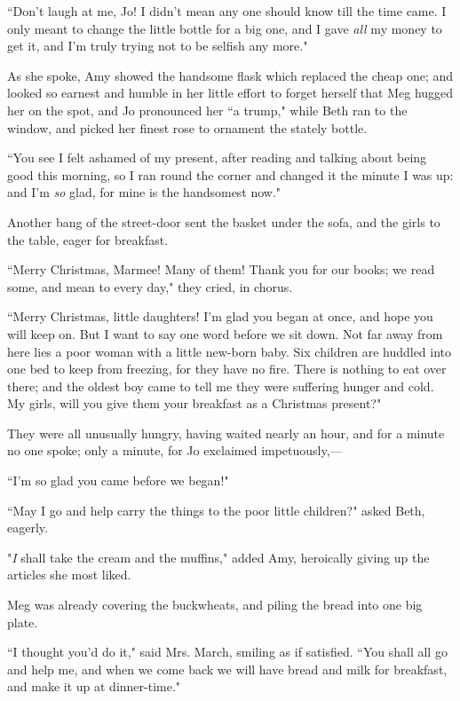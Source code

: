``Don't laugh at me, Jo! I didn't mean
any one should know till the time came. I only meant to change the
little bottle for a big one, and I gave \emph{all} my money to get it,
and I'm truly trying not to be selfish any more."

As she spoke, Amy showed the handsome flask which replaced the cheap
one; and looked so earnest and humble in her little effort to forget
herself that Meg hugged her on the spot, and Jo pronounced her ``a
trump," while Beth ran to the window, and picked her finest rose to
ornament the stately bottle.

``You see I felt ashamed of my present, after reading and talking about
being good this morning, so I ran round the corner and changed it the
minute I was up: and I'm \emph{so} glad, for mine is the
handsomest now."

Another bang of the street-door sent the basket under the sofa, and the
girls to the table, eager for breakfast.

``Merry Christmas, Marmee! Many of them! Thank you for our books; we read
some, and mean to every day," they cried, in chorus.

``Merry Christmas, little daughters! I'm glad you began
at once, and hope you will keep on. But I want to say one word before we
sit down. Not far away from here lies a poor woman with a little
new-born baby. Six children are huddled into one bed to keep from
freezing, for they have no fire. There is nothing to eat over there; and
the oldest boy came to tell me they were suffering hunger and cold. My
girls, will you give them your breakfast as a Christmas present?"

They were all unusually hungry, having waited nearly an hour, and for a
minute no one spoke; only a minute, for Jo exclaimed impetuously,---

``I'm so glad you came before we began!"

``May I go and help carry the things to the poor little children?" asked
Beth, eagerly.

"\emph{I} shall take the cream and the muffins," added Amy, heroically
giving up the articles she most liked.

Meg was already covering the buckwheats, and piling the bread into one
big plate.

``I thought you'd do it," said Mrs. March, smiling as if
satisfied. ``You shall all go and help me, and when we come back we will
have bread and milk for breakfast, and make it up at dinner-time."

